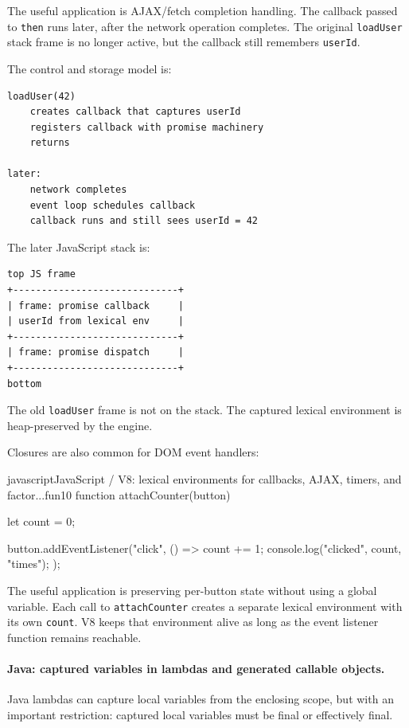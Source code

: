 \documentclass[a4paper,twoside]{report}
\begin{document}
The useful application is AJAX/fetch completion handling. The callback passed to \texttt{then} runs later, after the network operation completes. The original \texttt{loadUser} stack frame is no longer active, but the callback still remembers \texttt{userId}.

The control and storage model is:

\begin{verbatim}
loadUser(42)
    creates callback that captures userId
    registers callback with promise machinery
    returns

later:
    network completes
    event loop schedules callback
    callback runs and still sees userId = 42
\end{verbatim}

The later JavaScript stack is:

\begin{verbatim}
top JS frame
+-----------------------------+
| frame: promise callback     |
| userId from lexical env     |
+-----------------------------+
| frame: promise dispatch     |
+-----------------------------+
bottom
\end{verbatim}

The old \texttt{loadUser} frame is not on the stack. The captured lexical environment is heap-preserved by the engine.

Closures are also common for DOM event handlers:

\begin{codebox}[]{javascript}{JavaScript / V8: lexical environments for callbacks, AJAX, timers, and factor...}{fun10}
function attachCounter(button) {
    let count = 0;

    button.addEventListener("click", () => {
        count += 1;
        console.log("clicked", count, "times");
    });
}
\end{codebox}


The useful application is preserving per-button state without using a global variable. Each call to \texttt{attachCounter} creates a separate lexical environment with its own \texttt{count}. V8 keeps that environment alive as long as the event listener function remains reachable.

\paragraph{Java: captured variables in lambdas and generated callable objects.}

Java lambdas can capture local variables from the enclosing scope, but with an important restriction: captured local variables must be final or effectively final.
\end{document}
